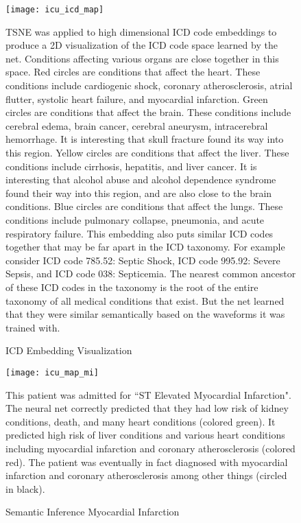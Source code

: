 \begin{figure}
\texttt{[image: icu\_icd\_map]}
\caption{ICD Embedding Visualization}
\vspace{12px}
TSNE was applied to high dimensional ICD code embeddings to produce a 2D visualization of the ICD code space learned by the net.  Conditions affecting various organs are close together in this space.  Red circles are conditions that affect the heart.  These conditions include cardiogenic shock, coronary atherosclerosis, atrial flutter, systolic heart failure, and myocardial infarction.  Green circles are conditions that affect the brain.  These conditions include cerebral edema, brain cancer, cerebral aneurysm, intracerebral hemorrhage.  It is interesting that skull fracture found its way into this region.  Yellow circles are conditions that affect the liver.  These conditions include cirrhosis, hepatitis, and liver cancer.  It is interesting that alcohol abuse and alcohol dependence syndrome found their way into this region, and are also close to the brain conditions.  Blue circles are conditions that affect the lungs.  These conditions include pulmonary collapse, pneumonia, and acute respiratory failure.  This embedding also puts similar ICD codes together that may be far apart in the ICD taxonomy.  For example consider ICD code 785.52: Septic Shock, ICD code 995.92: Severe Sepsis, and ICD code 038: Septicemia.  The nearest common ancestor of these ICD codes in the taxonomy is the root of the entire taxonomy of all medical conditions that exist.  But the net learned that they were similar semantically based on the waveforms it was trained with.
\label{fig:icu_icd_map}
\end{figure}
    
\begin{figure}
\texttt{[image: icu\_map\_mi]}
\caption{Semantic Inference Myocardial Infarction}
\vspace{12px}
This patient was admitted for ``ST Elevated Myocardial Infarction".  The neural net correctly predicted that they had low risk of kidney conditions, death, and many heart conditions (colored green).  It predicted high risk of liver conditions and various heart conditions including myocardial infarction and coronary atherosclerosis (colored red).  The patient was eventually in fact diagnosed with myocardial infarction and coronary atherosclerosis among other things (circled in black).
\label{fig:icu_map_mi}
\end{figure}

